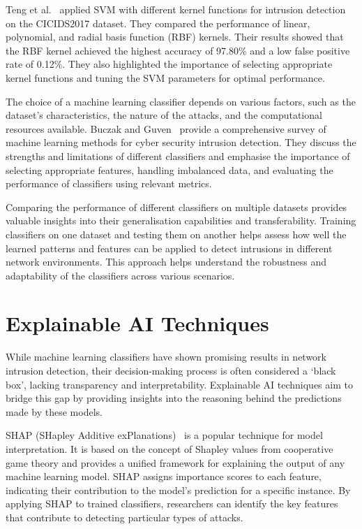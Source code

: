 Teng et al.~\cite{teng2017svm} applied SVM with different kernel functions for intrusion detection on the CICIDS2017 dataset. They compared the performance of linear, polynomial, and radial basis function (RBF) kernels. Their results showed that the RBF kernel achieved the highest accuracy of 97.80\% and a low false positive rate of 0.12\%. They also highlighted the importance of selecting appropriate kernel functions and tuning the SVM parameters for optimal performance.

The choice of a machine learning classifier depends on various factors, such as the dataset's characteristics, the nature of the attacks, and the computational resources available. Buczak and Guven~\cite{buczak2015survey} provide a comprehensive survey of machine learning methods for cyber security intrusion detection. They discuss the strengths and limitations of different classifiers and emphasise the importance of selecting appropriate features, handling imbalanced data, and evaluating the performance of classifiers using relevant metrics.

Comparing the performance of different classifiers on multiple datasets provides valuable insights into their generalisation capabilities and transferability. Training classifiers on one dataset and testing them on another helps assess how well the learned patterns and features can be applied to detect intrusions in different network environments. This approach helps understand the robustness and adaptability of the classifiers across various scenarios.

\section{Explainable AI Techniques}\label{sec:explainable}

While machine learning classifiers have shown promising results in network intrusion detection, their decision-making process is often considered a `black box', lacking transparency and interpretability. Explainable AI techniques aim to bridge this gap by providing insights into the reasoning behind the predictions made by these models.

SHAP (SHapley Additive exPlanations)~\cite{lundberg2017unified} is a popular technique for model interpretation. It is based on the concept of Shapley values from cooperative game theory and provides a unified framework for explaining the output of any machine learning model. SHAP assigns importance scores to each feature, indicating their contribution to the model's prediction for a specific instance. By applying SHAP to trained classifiers, researchers can identify the key features that contribute to detecting particular types of attacks.

